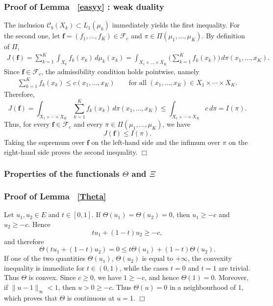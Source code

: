 \documentclass[twoside,11pt,a4paper]{article}
\newcommand*{\SavedRef}{}
\let\SavedRef\ref
\renewcommand*{\ref}[1]{  \begingroup
    \hypersetup{
      linkcolor=linkequation,
      linkbordercolor=linkequation,
    }    \SavedRef{#1}  \endgroup
}
\begin{document}
\subsubsection{Proof of Lemma~\ref{easyy}: weak duality}\label{weak}
The inclusion $\mathcal{C}_b(X_k)\subset L_1(\mu_k)$ immediately yields the first inequality.
For the second one, let $\boldsymbol{f}=(f_1,\dots,f_K)\in \mathcal{F}_c$
and $\pi\in \Pi(\mu_1,\dots,\mu_K)$.
By definition of $\Pi$,
\begin{align*}
J(\boldsymbol{f})
=\sum_{k=1}^{K} \int_{X_k} f_k(x_k)\, d\mu_k(x_k) 
=\int_{X_1\times\ldots \times X_K}
\Big( \sum_{k=1}^{K} f_k(x_k) \Big)
\, d\pi(x_1,\ldots,x_K).
\end{align*}
Since $\boldsymbol{f}\in \mathcal{F}_c$, the admissibility condition holds pointwise, namely
\begin{align*}
\sum_{k=1}^K f_k(x_k)\le c(x_1,\dots,x_K)
\qquad\text{for all }(x_1,\dots,x_K)\in X_1\times\cdots\times X_K.
\end{align*}
Therefore,
\begin{equation*}
J(\boldsymbol{f})
=\int_{X_1\times\cdots\times X_K}\sum_{k=1}^K f_k(x_k)\,d\pi(x_1,\dots,x_K)
\le \int_{X_1\times\cdots\times X_K} c\,d\pi
= I(\pi).
\end{equation*}
Thus, for every \(\boldsymbol f\in\mathcal F_c\) and every
\(\pi\in\Pi(\mu_1,\ldots,\mu_K)\), we have
\[
J(\boldsymbol f)\le I(\pi).
\]
Taking the supremum over $\boldsymbol{f}$ on the left-hand side and the infimum over $\pi$ on the right-hand side proves the second inequality.
\hfill\(\Box\)

\subsubsection{Properties of the functionals \texorpdfstring{$\Theta$}{} and \texorpdfstring{$\Xi$}{}}\label{ThetaXi}


\subsubsection*{Proof of Lemma~\ref{Theta}}

Let \(u_1,u_2\in E\) and \(t\in[0,1]\). If \(\Theta(u_1)=\Theta(u_2)=0\), then \(u_1\ge -c\) and \(u_2\ge -c\). Hence \[ t u_1+(1-t)u_2\ge -c, \] and therefore \[ \Theta(tu_1+(1-t)u_2)=0 \le t\Theta(u_1)+(1-t)\Theta(u_2). \] If one of the two quantities \(\Theta(u_1)\), \(\Theta(u_2)\) is equal to \(+\infty\), the convexity inequality is immediate for \(t\in(0,1)\), while the cases \(t=0\) and \(t=1\) are trivial. Thus \(\Theta\) is convex. Since \(c\ge 0\), we have \(1\ge -c\), and hence \(\Theta(1)=0\). Moreover, if \(\|u-1\|_\infty<1\), then \(u>0\ge -c\). Thus \(\Theta(u)=0\) in a neighbourhood of \(1\), which proves that \(\Theta\) is continuous at \(u=1\).
\hfill\(\Box\)
\end{document}
